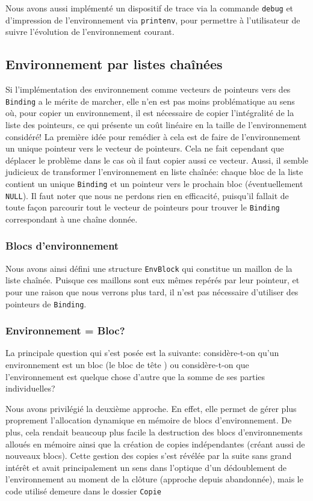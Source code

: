 \documentclass[a4paper,11pt]{article}
\begin{document}
Nous avons aussi implémenté un dispositif de trace via la commande 
\texttt{debug} et d'impression de l'environnement via \texttt{printenv}, 
pour permettre à l'utilisateur de suivre l'évolution de l'environnement courant.

\subsection{Environnement par listes chaînées}

Si l’implémentation des environnement comme vecteurs 
de pointeurs vers des \texttt{Binding} a le mérite de marcher, elle n'en est
pas moins problématique au sens où, pour copier un environnement, il est
nécessaire de copier l'intégralité de la liste des pointeurs, ce qui présente un
coût linéaire en la taille de l'environnement considéré!
La première idée pour remédier à cela est de faire de l'environnement un unique
pointeur vers le vecteur de pointeurs. Cela ne fait cependant que déplacer le
problème dans le cas où il faut copier aussi ce vecteur.
Aussi, il semble judicieux de transformer l’environnement en liste chaînée:
chaque bloc de la liste contient un unique \texttt{Binding} et un pointeur vers
le prochain bloc (éventuellement \texttt{NULL}). Il faut noter que nous ne perdons rien
en efficacité, puisqu'il fallait de toute façon parcourir tout le vecteur de
pointeurs pour trouver le \texttt{Binding} correspondant à une chaîne donnée.

\subsubsection{Blocs d’environnement}

Nous avons ainsi défini une structure \texttt{EnvBlock} qui constitue un maillon
de la liste chaînée. Puisque ces maillons sont eux mêmes repérés par leur
pointeur, et pour une raison que nous verrons plus tard, il n'est pas nécessaire
d'utiliser des pointeurs de \texttt{Binding}.

\subsubsection{Environnement = Bloc?}

La principale question qui s'est posée est la suivante: considère-t-on qu'un
environnement est un bloc (le bloc de \og tête \fg) ou considère-t-on que
l'environnement est quelque chose d'autre que la somme de ses
parties individuelles?

Nous avons privilégié la deuxième approche. En effet, elle permet de gérer plus
proprement l'allocation dynamique en mémoire de blocs d'environnement. De plus,
cela rendait beaucoup plus facile la destruction des blocs d'environnements
alloués en mémoire ainsi que la création de copies indépendantes (créant aussi
de nouveaux blocs). Cette gestion des copies s'est révélée par la suite sans
grand intérêt et avait principalement un sens dans l'optique d'un dédoublement
de l'environnement au moment de la clôture (approche depuis abandonnée), mais le
code utilisé demeure dans le dossier \texttt{Copie}
\end{document}

